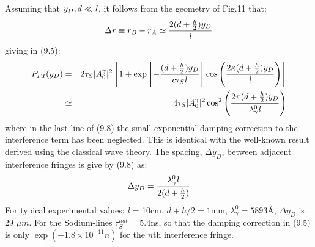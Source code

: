 {\begin{equation}
  \end{equation}
   Assuming that $y_D, d \ll  {\it l}$, it follows from the geometry of Fig.11 that:
   \begin{equation}
  \Delta r \equiv  r_B-r_A \simeq \frac{2(d +\frac{h}{2})y_D}{{\it l}}
   \end{equation}
   giving in (9.5):
    \begin{eqnarray}
   P_{FI}(y_D) & = & 2 \tau_S |A_0^{\gamma}|^2\left[1+\exp\left[-\frac{(d +\frac{h}{2})y_D}{c \tau_S {\it l}}\right]
   \cos \left(\frac{2\kappa(d +\frac{h}{2})y_D}{{\it l}}\right)\right]     \nonumber \\
     & \simeq &  4 \tau_S |A_0^{\gamma}|^2 \cos^2 \left( \frac{2 \pi (d +\frac{h}{2})y_D}{\lambda_{\gamma}^0 {\it l}}
    \right)
 \end{eqnarray}
  where in the last line of (9.8) the small exponential damping correction to the interference term has
  been neglected. This is identical with the well-known result derived using the classical wave theory.
  The spacing, $\Delta y_D$, between adjacent interference fringes is give by (9.8) as:
   \begin{equation}
  \Delta y_D = \frac{\lambda_{\gamma}^0 {\it l}}{2(d +\frac{h}{2})}
   \end{equation}  
    For typical experimental values: {\it l } = 10cm, $d+h/2 = 1$mm, $\lambda_{\gamma}^0 = 5893$\AA, $\Delta y_D$ is
    29 $\mu m$. For the Sodium-lines $\tau^{nat}_S = 5.4$ns, so that the damping correction in (9.5)
    is only $\exp(-1.8 \times 10^{-11} n)$ for the $n$th interference fringe.

}
